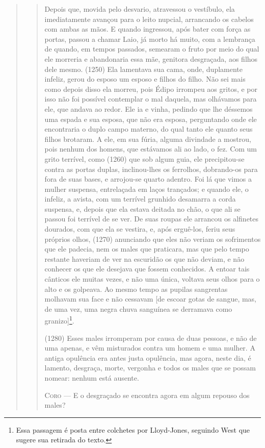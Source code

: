 \begin{verse}
\begin{verse}
Depois que, movida pelo desvario, atravessou o vestíbulo, ela
imediatamente avançou para o leito nupcial, arrancando os cabelos com
ambas as mãos. E quando ingressou, após bater com força as portas,
passou a chamar Laio, já morto há muito, com a lembrança de quando, em
tempos passados, semearam o fruto por meio do qual ele morreria e
abandonaria essa mãe, genitora desgraçada, aos filhos dele mesmo. (1250)
Ela lamentava sua cama, onde, duplamente infeliz, gerou do esposo um
esposo e filhos do filho. Não sei mais como depois disso ela morreu,
pois Édipo irrompeu aos gritos, e por isso não foi possível contemplar o
mal daquela, mas olhávamos para ele, que andava ao redor. Ele ia e
vinha, pedindo que lhe déssemos uma espada e sua esposa, que não era
esposa, perguntando onde ele encontraria o duplo campo materno, do qual
tanto ele quanto seus filhos brotaram. A ele, em sua fúria, alguma
divindade a mostrou, pois nenhum dos homens, que estávamos ali ao lado,
o fez. Com um grito terrível, como (1260) que sob algum guia, ele
precipitou-se contra as portas duplas, inclinou-lhes os ferrolhos,
dobrando-os para fora de suas bases, e arrojou-se quarto adentro. Foi lá
que vimos a mulher suspensa, entrelaçada em laços trançados; e quando
ele, o infeliz, a avista, com um terrível grunhido desamarra a corda
suspensa, e, depois que ela estava deitada no chão, o que ali se passou
foi terrível de se ver. De suas roupas ele arrancou os alfinetes
dourados, com que ela se vestira, e, após erguê-los, feriu seus próprios
olhos, (1270) anunciando que eles não veriam os sofrimentos que ele
padecia, nem os males que praticara, mas que pelo tempo restante
haveriam de ver na escuridão os que não deviam, e não conhecer os que
ele desejava que fossem conhecidos. A entoar tais cânticos ele muitas
vezes, e não uma única, voltava seus olhos para o alto e os golpeava. Ao
mesmo tempo as pupilas sangrentas molhavam sua face e não cessavam {[}de
escoar gotas de sangue, mas, de uma vez, uma negra chuva sanguínea se
derramava como granizo{]}\footnote{Essa passagem é posta entre colchetes
  por Lloyd-Jones, seguindo West que sugere sua retirada do texto.}.

(1280) Esses males irromperam por causa de duas pessoas, e não de uma
apenas, e vêm misturados contra um homem e uma mulher. A antiga
opulência era antes justa opulência, mas agora, neste dia, é lamento,
desgraça, morte, vergonha e todos os males que se possam nomear: nenhum
está ausente.

\textsc{Coro} --- E o desgraçado se encontra agora em algum repouso dos males?


\end{verse}
\end{verse}
